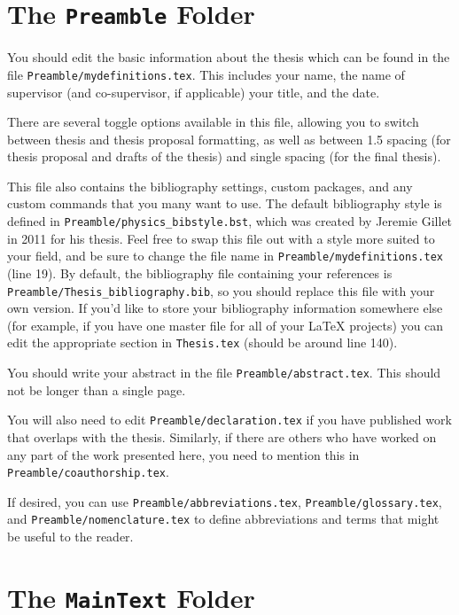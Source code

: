\section{The \texttt{Preamble} Folder}

You should edit the basic information about the thesis
which can be found in the file \texttt{Preamble/mydefinitions.tex}. This includes
your name, the name of supervisor (and co-supervisor, if applicable) your title, 
and the date.

There are several toggle options available in this file, allowing you to
switch between thesis and thesis proposal formatting, as well as between
1.5 spacing (for thesis proposal and drafts of the thesis) and single
spacing (for the final thesis).

This file also contains the bibliography settings, custom packages, and any custom
commands that you many want to use. The default bibliography style is defined in
\texttt{Preamble/physics\_bibstyle.bst}, which was created by Jeremie Gillet in 2011
for his thesis. Feel free to swap this file out with a style more suited to your
field, and be sure to change the file name in \texttt{Preamble/mydefinitions.tex}
(line 19). By default, the bibliography file containing
your references is \texttt{Preamble/Thesis\_bibliography.bib}, so you should
replace this file with your own version. If you'd like to store your bibliography
information somewhere else (for example, if you have one master file for all of your
LaTeX projects) you can edit the appropriate section in \texttt{Thesis.tex}
(should be around line 140).

You should write your abstract in the file \texttt{Preamble/abstract.tex}. This
should not be longer than a single page.

You will also need to edit \texttt{Preamble/declaration.tex} if you have
published work that overlaps with the thesis. Similarly, if
there are others who have worked on any part of the work presented here,
you need to mention this in \texttt{Preamble/coauthorship.tex}.

If desired, you can use \texttt{Preamble/abbreviations.tex}, \texttt{Preamble/glossary.tex},
and \texttt{Preamble/nomenclature.tex} to define abbreviations and terms that
might be useful to the reader.

\section{The \texttt{MainText} Folder}

